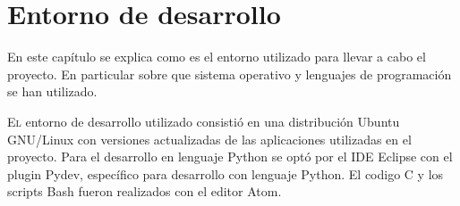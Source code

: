
\chapter{Entorno de desarrollo}
\label{chap:entorno-desarrollo}

En este capítulo se explica como es el entorno utilizado para llevar a cabo el proyecto. En particular sobre que sistema operativo y lenguajes de programación se han utilizado.

\lettrine{E}{l} entorno de desarrollo utilizado consistió en una distribución Ubuntu GNU/Linux con versiones actualizadas de las aplicaciones utilizadas en el proyecto. Para el desarrollo en lenguaje Python se optó por el IDE Eclipse con el plugin Pydev, específico para desarrollo con lenguaje Python. El codigo C y los scripts Bash fueron realizados con el editor Atom.
